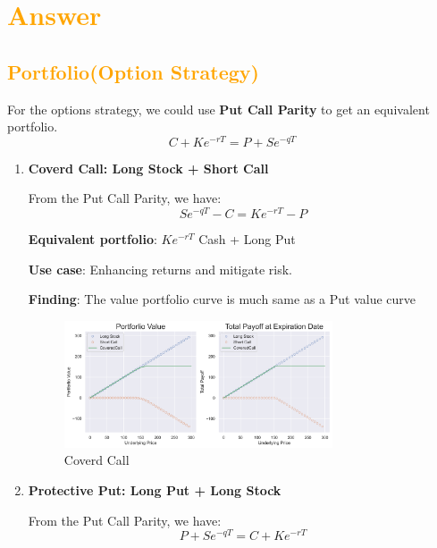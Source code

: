 \documentclass[11pt,en]{elegantpaper}
\begin{document}
\section*{\textcolor{orange}{Answer}}

\subsection*{\textcolor{orange}{Portfolio(Option Strategy)}}
For the options strategy, we could use \textbf{Put Call Parity} to get an equivalent portfolio.
\begin{equation}
    C + Ke^{-rT} = P + Se^{-qT}
\end{equation}

\begin{enumerate}
    \item \textbf{Coverd Call: Long Stock + Short Call}

    From the Put Call Parity, we have:
    \begin{equation}
        Se^{-qT} - C = Ke^{-rT} - P
    \end{equation}

    \textbf{Equivalent portfolio}: $Ke^{-rT}$ Cash + Long Put 
    
    \textbf{Use case}: Enhancing returns and mitigate risk.

    \textbf{Finding}: The value portfolio curve is much same as a Put value curve
    \begin{figure}[htbp] 
        \centering 
        \includegraphics[width=0.75\textwidth]{./image/image_3/optionStrategy/CoveredCall.png} 
        \caption{Coverd Call}
    \end{figure}

    \item \textbf{Protective Put: Long Put + Long Stock}
    
    From the Put Call Parity, we have:
    \begin{equation}
        P + Se^{-qT} = C + Ke^{-rT}
    \end{equation}


\end{enumerate}
\end{document}
